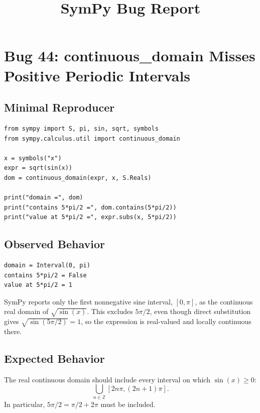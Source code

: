 \documentclass[11pt]{article}
\title{SymPy Bug Report}
\author{}
\date{}
\begin{document}
\maketitle

\section{Bug 44: continuous\_domain Misses Positive Periodic Intervals}

\subsection{Minimal Reproducer}

\medskip

\begin{lstlisting}[style=bugpython]
from sympy import S, pi, sin, sqrt, symbols
from sympy.calculus.util import continuous_domain

x = symbols("x")
expr = sqrt(sin(x))
dom = continuous_domain(expr, x, S.Reals)

print("domain =", dom)
print("contains 5*pi/2 =", dom.contains(5*pi/2))
print("value at 5*pi/2 =", expr.subs(x, 5*pi/2))
\end{lstlisting}

\subsection{Observed Behavior}

\medskip

\begin{lstlisting}[style=bugpython]
domain = Interval(0, pi)
contains 5*pi/2 = False
value at 5*pi/2 = 1
\end{lstlisting}

SymPy reports only the first nonnegative sine interval, \([0,\pi]\), as the
continuous real domain of \(\sqrt{\sin(x)}\). This excludes \(5\pi/2\), even
though direct substitution gives \(\sqrt{\sin(5\pi/2)}=1\), so the expression is
real-valued and locally continuous there.

\subsection{Expected Behavior}

The real continuous domain should include every interval on which
\(\sin(x)\geq 0\):
\[
  \bigcup_{n\in\mathbb{Z}} [2n\pi,(2n+1)\pi].
\]
In particular, \(5\pi/2=\pi/2+2\pi\) must be included.
\end{document}
